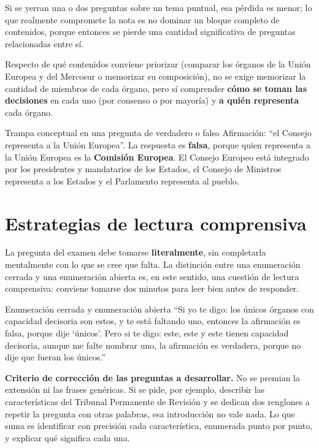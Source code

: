 \documentclass[12pt,oneside]{book}
\begin{document}
Si se yerran una o dos preguntas sobre un tema puntual, esa pérdida es menor; lo que realmente compromete la nota es no dominar un bloque completo de contenidos, porque entonces se pierde una cantidad significativa de preguntas relacionadas entre sí.

Respecto de qué contenidos conviene priorizar (comparar los órganos de la Unión Europea y del Mercosur o memorizar su composición), no se exige memorizar la cantidad de miembros de cada órgano, pero sí comprender \textbf{cómo se toman las decisiones} en cada uno (por consenso o por mayoría) y \textbf{a quién representa} cada órgano.

\begin{example}{Trampa conceptual en una pregunta de verdadero o falso}
Afirmación: “el Consejo representa a la Unión Europea”. La respuesta es \textbf{falsa}, porque quien representa a la Unión Europea es la \textbf{Comisión Europea}. El Consejo Europeo está integrado por los presidentes y mandatarios de los Estados, el Consejo de Ministros representa a los Estados y el Parlamento representa al pueblo.
\end{example}

\section{Estrategias de lectura comprensiva}

La pregunta del examen debe tomarse \textbf{literalmente}, sin completarla mentalmente con lo que se cree que falta. La distinción entre una enumeración cerrada y una enumeración abierta es, en este sentido, una cuestión de lectura comprensiva: conviene tomarse dos minutos para leer bien antes de responder.

\begin{example}{Enumeración cerrada y enumeración abierta}
“Si yo te digo: los únicos órganos con capacidad decisoria son estos, y te está faltando uno, entonces la afirmación es falsa, porque dije ‘únicos’. Pero si te digo: este, este y este tienen capacidad decisoria, aunque me falte nombrar uno, la afirmación es verdadera, porque no dije que fueran los únicos.”
\end{example}

\begin{important}
\textbf{Criterio de corrección de las preguntas a desarrollar.} No se premian la extensión ni las frases genéricas. Si se pide, por ejemplo, describir las características del Tribunal Permanente de Revisión y se dedican dos renglones a repetir la pregunta con otras palabras, esa introducción no vale nada. Lo que suma es identificar con precisión cada característica, enumerada punto por punto, y explicar qué significa cada una.
\end{important}
\end{document}
